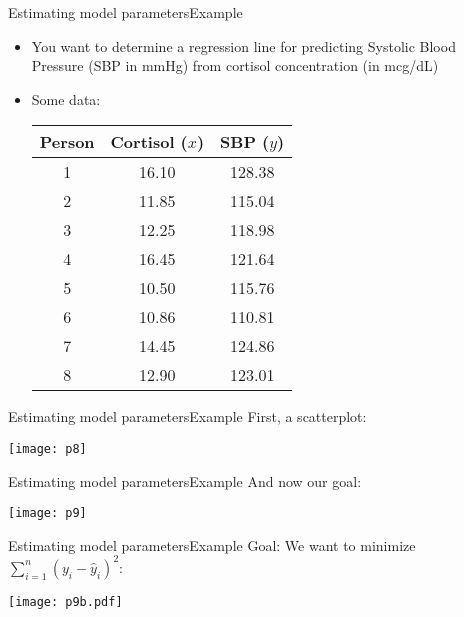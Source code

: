 \documentclass[xcolor=dvipsnames]{beamer}
\begin{document}
\begin{frame}{Estimating model parameters}{Example}
	\begin{itemize}
		\item You want to determine a regression line for predicting Systolic Blood Pressure (SBP in mmHg) from cortisol concentration (in mcg/dL) \pause
		\item Some data: \pause
		\begin{center}
			\begin{tabular}{ccc}
				\hline
				Person& Cortisol ($x$) & SBP ($y$) \\ 
				\hline
				1 & 16.10 & 128.38 \\ 
				2 & 11.85 & 115.04 \\ 
				3 & 12.25 & 118.98 \\ 
				4 & 16.45 & 121.64 \\ 
				5 & 10.50 & 115.76 \\ 
				6 & 10.86 & 110.81 \\ 
				7 & 14.45 & 124.86 \\ 
				8 & 12.90 & 123.01 \\ 
				\hline
			\end{tabular}
		\end{center}
	\end{itemize}
\end{frame}

\begin{frame}{Estimating model parameters}{Example}
First, a scatterplot:
\begin{center}
	\texttt{[image: p8]}
\end{center}
\end{frame}

\begin{frame}{Estimating model parameters}{Example}
And now our goal:
\begin{center}
	\texttt{[image: p9]}
\end{center}
\end{frame}

\begin{frame}{Estimating model parameters}{Example}
Goal: We want to minimize $\sum_{i=1}^{n} \left(y_i - \hat{y}_i\right)^2$:
\begin{center}
	\texttt{[image: p9b.pdf]}
\end{center}
\end{frame}
\end{document}
